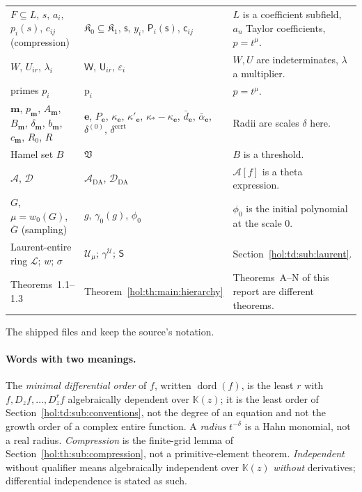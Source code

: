 \documentclass[11pt]{article}
\numberwithin{equation}{section}
\theoremstyle{definition}
\theoremstyle{remark}
\newcommand{\KK}{\mathbb K}
\begin{document}
{\begin{longtable}{@{}>{\raggedright\arraybackslash}p{}
>{\raggedright\arraybackslash}p{}
>{\raggedright\arraybackslash}p{}@{}}
$F\subseteq L$, $s$, $a_i$, $p_i(s)$, $c_{ij}$ (compression) &
$\mathfrak K_0\subseteq\mathfrak K_1$, $\mathsf s$, $y_i$, $\mathsf P_i(\mathsf
s)$, $\mathsf c_{ij}$ & $L$ is a coefficient subfield, $a_n$ Taylor
coefficients, $p=t^\mu$.\\
$W$, $U_{ir}$, $\lambda_i$ & $\mathsf W$, $\mathsf U_{ir}$, $\varepsilon_i$ &
$W,U$ are indeterminates, $\lambda$ a multiplier.\\
primes $p_i$ & $\mathrm p_i$ & $p=t^\mu$.\\
$\boldsymbol m$, $p_{\boldsymbol m}$, $A_{\boldsymbol m}$, $B_{\boldsymbol m}$,
$\delta_{\boldsymbol m}$, $b_{\boldsymbol m}$, $c_{\boldsymbol m}$, $R_0$, $R$ &
$\mathbf e$, $P_{\mathbf e}$, $\kappa_{\mathbf e}$, $\kappa'_{\mathbf e}$,
$\kappa_*-\kappa_{\mathbf e}$, $\bar d_{\mathbf e}$, $\bar\alpha_{\mathbf e}$,
$\delta^{(0)}$, $\delta^{\mathrm{cert}}$ & Radii are scales $\delta$ here.\\
Hamel set $B$ & $\mathfrak V$ & $B$ is a threshold.\\
$\mathcal A$, $\mathcal D$ & $\mathcal A_{\mathrm{DA}}$, $\mathcal D_{\mathrm{DA}}$
& $\mathcal A[f]$ is a theta expression.\\
$G$, $\mu=w_0(G)$, $\overline G$ (sampling) & $g$, $\gamma_0(g)$, $\phi_0$ &
$\phi_0$ is the initial polynomial at the scale $0$.\\
Laurent-entire ring $\mathcal L$; $w$; $\sigma$ & $\mathcal U_\mu$;
$\gamma^{\mathcal U}$; $\mathsf S$ & Section~\ref{hol:td:sub:laurent}.\\
Theorems~1.1--1.3 & Theorem~\ref{hol:th:main:hierarchy} & Theorems~A--N of
this report are different theorems.\\
\bottomrule
\end{longtable}}
The shipped files  and
 keep the source's notation.

\paragraph{Words with two meanings.}
The \emph{minimal differential order} of $f$, written $\operatorname{dord}(f)$,
is the least $r$ with $f,D_zf,\ldots,D_z^rf$ algebraically dependent over
$\KK(z)$; it is the
least order of Section~\ref{hol:td:sub:conventions}, not the degree of an
equation and not the growth order of a complex entire function. A
\emph{radius} $t^{-\delta}$ is a Hahn monomial, not a real radius.
\emph{Compression} is the finite-grid lemma of
Section~\ref{hol:th:sub:compression}, not a primitive-element theorem.
\emph{Independent} without qualifier means algebraically independent over
$\KK(z)$ \emph{without} derivatives; differential independence is stated as
such.
\end{document}
